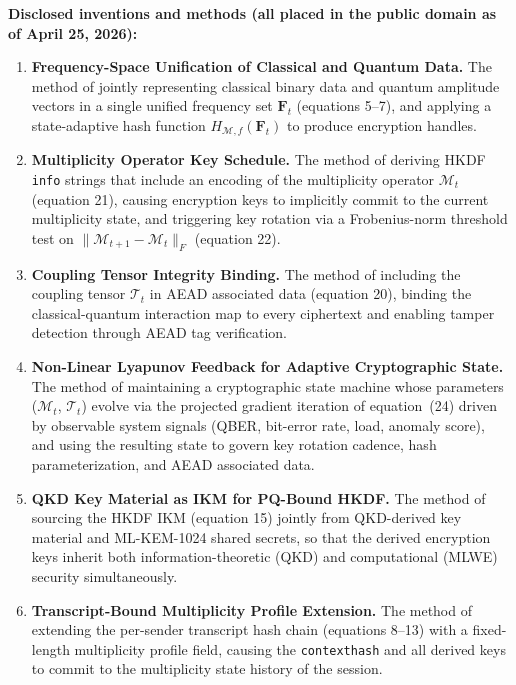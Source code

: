 \documentclass[12pt,letterpaper]{article}
\theoremstyle{plain}
\theoremstyle{definition}
\begin{document}
\begin{defensebox}
\textbf{Disclosed inventions and methods (all placed in the public domain as
of April 25, 2026):}

\begin{enumerate}[leftmargin=2em]
  \item \textbf{Frequency-Space Unification of Classical and Quantum Data.}
    The method of jointly representing classical binary data and quantum
    amplitude vectors in a single unified frequency set $\mathbf{F}_t$
    (equations 5--7), and applying a state-adaptive hash function
    $H_{\mathcal{M},f}(\mathbf{F}_t)$ to produce encryption handles.

  \item \textbf{Multiplicity Operator Key Schedule.}
    The method of deriving HKDF \texttt{info} strings that include an
    encoding of the multiplicity operator $\mathcal{M}_t$ (equation 21),
    causing encryption keys to implicitly commit to the current
    multiplicity state, and triggering key rotation via a Frobenius-norm
    threshold test on $\|\mathcal{M}_{t+1} - \mathcal{M}_t\|_F$
    (equation 22).

  \item \textbf{Coupling Tensor Integrity Binding.}
    The method of including the coupling tensor $\mathcal{T}_t$ in AEAD
    associated data (equation 20), binding the classical-quantum interaction
    map to every ciphertext and enabling tamper detection through AEAD tag
    verification.

  \item \textbf{Non-Linear Lyapunov Feedback for Adaptive Cryptographic
    State.}
    The method of maintaining a cryptographic state machine whose
    parameters ($\mathcal{M}_t$, $\mathcal{T}_t$) evolve via the projected
    gradient iteration of equation~(24) driven by observable system
    signals (QBER, bit-error rate, load, anomaly score), and using the
    resulting state to govern key rotation cadence, hash parameterization,
    and AEAD associated data.

  \item \textbf{QKD Key Material as IKM for PQ-Bound HKDF.}
    The method of sourcing the HKDF IKM (equation 15) jointly from
    QKD-derived key material and ML-KEM-1024 shared secrets, so that the
    derived encryption keys inherit both information-theoretic (QKD) and
    computational (MLWE) security simultaneously.

  \item \textbf{Transcript-Bound Multiplicity Profile Extension.}
    The method of extending the per-sender transcript hash chain
    (equations 8--13) with a fixed-length multiplicity profile field,
    causing the \texttt{contexthash} and all derived keys to commit to
    the multiplicity state history of the session.


\end{enumerate}
\end{defensebox}
\end{document}
